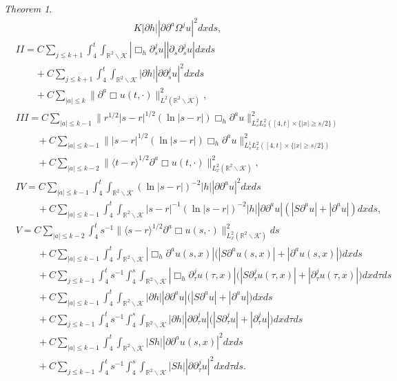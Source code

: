 \documentclass[11pt, reqno]{amsart}
\theoremstyle{definition}
\theoremstyle{remark}
\newtheorem{thm}{Theorem}[section]
\theoremstyle{definition}
\numberwithin{equation}{section}
\numberwithin{equation}{section}
\def\leq{\leqslant}
\def\geq{\geqslant}
\begin{document}
\begin{thm}
\begin{align*}
{{K}}|\partial h||\partial\partial^a\Omega^ju|^2dxds,
\end{align*}
\begin{align*}
&II=C\sum_{j\leq k+1}\int_4^t\int_{\mathbb R^2\backslash\mathcal
{K}}|\Box_h
\partial_s^ju||\partial_s\partial_s^ju|dxds
\nonumber\\&\qquad+C\sum_{j\leq k+1}\int_4^t\int_{\mathbb
R^2\backslash\mathcal {K}}|\partial h||\partial\partial_s^ju|^2dxds
\nonumber\\&\qquad+C\sum_{|a|\leq k}\|\partial^a\Box
u(t,\cdot)\|^2_{L^2(\mathbb R^2\backslash\mathcal {K})},
\\&III=C\sum_{|a|\leq
k-1}\|r^{1/2}|s-r|^{1/2}(\ln|s-r|)\Box_h\partial^au\|^2_{L^2_sL^2_x([4,t]\times\{|x|\geq
s/2\})} \nonumber\\&\qquad\ +C\sum_{|a|\leq
k-1}\||s-r|^{1/2}(\ln|s-r|)\Box_h\partial^au\|^2_{L_s^1L_x^2([4,t]\times\{|x|\geq
s/2\})}\nonumber\\&\qquad\ +C\sum_{|a|\leq k-2}\|\langle
t-r\rangle^{1/2}\partial^a\Box u(t,\cdot)\|^2_{L_x^2(\mathbb
R^2\backslash\mathcal {K})},
\\&IV=C\sum_{|a|\leq k-1}\int_4^t\int_{\mathbb R^2\backslash\mathcal {K}}(\ln|s-r|)^{-2}|h||\partial\partial^au|^2dxds
\nonumber\\&\qquad\ +C\sum_{|a|\leq k-1}\int_4^t\int_{\mathbb
R^2\backslash\mathcal
{K}}|s-r|^{-1}(\ln|s-r|)^{-2}|h||\partial\partial^au|(|S\partial^au|+|\partial^au|)dxds,
\\&V=C\sum_{|a|\leq k-2}\int_4^ts^{-1}\|\langle
s-r\rangle^{1/2}\partial^a\Box u(s,\cdot)\|^2_{L_x^2(\mathbb
R^2\backslash\mathcal {K})}ds
\nonumber\\&\qquad\ +C\sum_{|a|\leq k-1}\int_4^t\int_{\mathbb R^2\backslash\mathcal
{K}}|\Box_h\partial^au(s,x)|\big(|S\partial^au(s,x)|+|\partial^au(s,x)|\big)dxds
\nonumber\\&\qquad\ +C\sum_{j\leq
k-1}\int_4^ts^{-1}\int_4^s\int_{\mathbb R^2\backslash\mathcal
{K}}|\Box_h\partial_{\tau}^ju(\tau,x)|\big(|S\partial_{\tau}^ju(\tau,x)|+|\partial_{\tau}^ju(\tau,x)|\big)dxd\tau
ds
\nonumber\\&\qquad\ +C\sum_{|a|\leq k-1}\int_4^t\int_{\mathbb
R^2\backslash\mathcal {K}}|\partial
h||\partial\partial^au|\big(|S\partial^au|+|\partial^au|\big)dxds
\nonumber\\&\qquad\
+C\sum_{j\leq k-1}\int_4^ts^{-1}\int_4^s\int_{\mathbb
R^2\backslash\mathcal {K}}|\partial
h||\partial\partial_{\tau}^ju|\big(|S\partial_{\tau}^ju|+|\partial_{\tau}^ju|\big)dxd\tau
ds
\nonumber\\&\qquad\ +C\sum_{|a|\leq k-1}\int_4^t\int_{\mathbb
R^2\backslash\mathcal {K}}|Sh||\partial\partial^au(s,x)|^2dxds
\nonumber\\&\qquad\ +C\sum_{j\leq
k-1}\int_4^ts^{-1}\int_4^s\int_{\mathbb R^2\backslash\mathcal
{K}}|Sh||\partial\partial_{\tau}^ju|^2dxd\tau ds.
\end{align*}
\end{thm}
\end{document}

